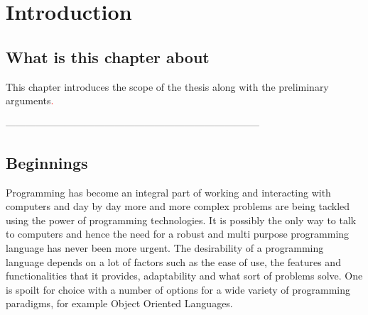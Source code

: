 \documentclass[thesis-solanki.tex]{subfiles}
\begin{document}
\chapter{Introduction}\label{chap:introduction}


\section{What is this chapter about}

This chapter introduces the scope of the thesis along with the preliminary arguments{\Huge\textcolor{red}{.}}


-----------------------------------------------------------------------------


\section{Beginnings}
\begin{comment}
Computers have become a part of everyone's life. From the ones in our pockets to the ones on desks or in our school bags, working or in fact living without 
them is difficult if not impossible. All the more reason to know how to use one. Simply speaking just using a computer these days is not enough. To be able 
to utilise their true potential, one must go deeper and communicate with them. This is where the art of programming steps in.     
\end{comment}

Programming has become an integral part of working and interacting with computers and day by day more and more complex
problems are being tackled using the power of programming technologies.
It is possibly the only way to talk to computers and hence the need for a robust and multi purpose programming language
has never been more urgent.
The desirability of a programming language depends on a lot of factors such as the ease of use, the features and
functionalities that it provides, adaptability and what sort of problems  solve.
One is spoilt for choice with a number of options for a wide variety of programming paradigms, for example Object
Oriented Languages.
\end{document}
